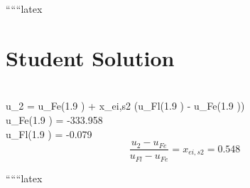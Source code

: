 ``````latex


\section*{Student Solution}

 \\
u_2 = u_{Fe}(1.9 ) + x_{ei,s2} (u_{Fl}(1.9 ) - u_{Fe}(1.9 )) \\
u_{Fe}(1.9 ) = -333.958  \\
u_{Fl}(1.9 ) = -0.079  \\

\[
\frac{u_2 - u_{Fe}}{u_{Fl} - u_{Fe}} = x_{ei,s2} = 0.548
\]

``````latex



